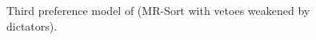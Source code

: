 \begin{figure}
	
\caption{Third preference model of \GJ (MR-Sort with vetoes weakened by dictators).}\label{fig:ex1-model3}
\end{figure}